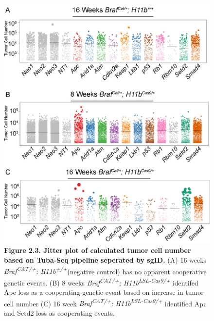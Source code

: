 \begin{figure}
\hypertarget{fig:06}{%
\centering
\includegraphics[width=1\textwidth,height=\textheight]{images/tuba3.png}
\caption{\textbf{Figure 2.3. Jitter plot of calculated tumor cell number based on Tuba-Seq pipeline seperated by sgID.} (A) 16 weeks \emph{Braf\textsuperscript{CAT/+}; H11b\textsuperscript{+/+}}(negative control) has no apparent cooperative genetic events. (B) 8 weeks \emph{Braf\textsuperscript{CAT/+}; H11b\textsuperscript{LSL-Cas9/+}} identifed Apc loss as a cooperating genetic event based on increase in tumor cell number (C) 16 week \emph{Braf\textsuperscript{CAT/+}; H11b\textsuperscript{LSL-Cas9/+}} identified Apc and Setd2 loss as cooperating events.}\label{fig:06}
}
\end{figure}

